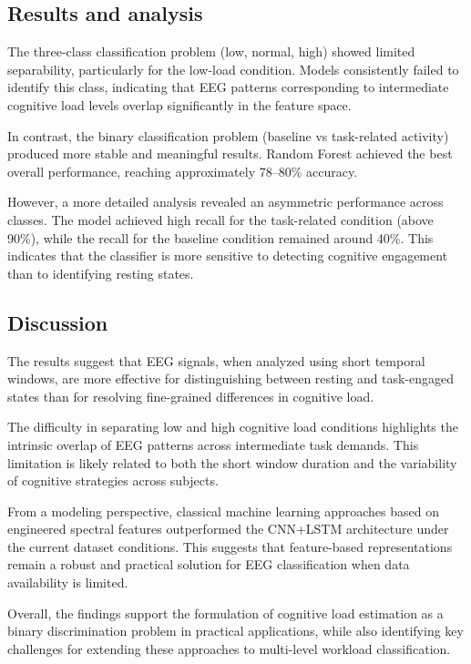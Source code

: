\documentclass[10pt]{iopart}
\begin{document}
\subsection{Results and analysis}

The three-class classification problem (low, normal, high) showed limited separability, particularly for the low-load condition. Models consistently failed to identify this class, indicating that EEG patterns corresponding to intermediate cognitive load levels overlap significantly in the feature space.

In contrast, the binary classification problem (baseline vs task-related activity) produced more stable and meaningful results. Random Forest achieved the best overall performance, reaching approximately 78--80\% accuracy.

However, a more detailed analysis revealed an asymmetric performance across classes. The model achieved high recall for the task-related condition (above 90\%), while the recall for the baseline condition remained around 40\%. This indicates that the classifier is more sensitive to detecting cognitive engagement than to identifying resting states.

\subsection{Discussion}

The results suggest that EEG signals, when analyzed using short temporal windows, are more effective for distinguishing between resting and task-engaged states than for resolving fine-grained differences in cognitive load.

The difficulty in separating low and high cognitive load conditions highlights the intrinsic overlap of EEG patterns across intermediate task demands. This limitation is likely related to both the short window duration and the variability of cognitive strategies across subjects.

From a modeling perspective, classical machine learning approaches based on engineered spectral features outperformed the CNN+LSTM architecture under the current dataset conditions. This suggests that feature-based representations remain a robust and practical solution for EEG classification when data availability is limited.

Overall, the findings support the formulation of cognitive load estimation as a binary discrimination problem in practical applications, while also identifying key challenges for extending these approaches to multi-level workload classification.
\end{document}
